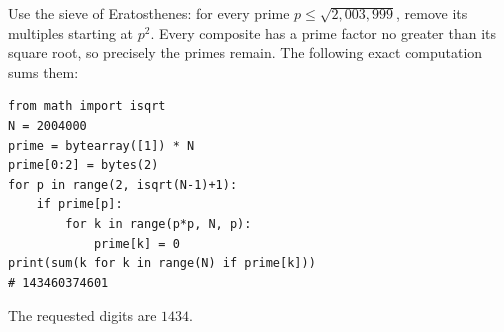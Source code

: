 Use the sieve of Eratosthenes: for every prime $p\le\sqrt{2{,}003{,}999}$, remove its multiples starting at $p^2$. Every composite has a prime factor no greater than its square root, so precisely the primes remain. The following exact computation sums them:
\begin{verbatim}
from math import isqrt
N = 2004000
prime = bytearray([1]) * N
prime[0:2] = bytes(2)
for p in range(2, isqrt(N-1)+1):
    if prime[p]:
        for k in range(p*p, N, p):
            prime[k] = 0
print(sum(k for k in range(N) if prime[k]))
# 143460374601
\end{verbatim}
The requested digits are $\boxed{1434}$.
